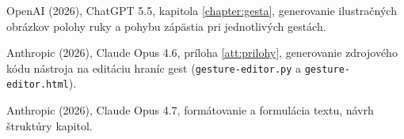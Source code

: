 \begin{trivlist}

\item OpenAI (2026), ChatGPT 5.5, kapitola \ref{chapter:gesta}, generovanie ilustračných obrázkov polohy ruky a pohybu zápästia pri jednotlivých gestách.

\item Anthropic (2026), Claude Opus 4.6, príloha \ref{att:prilohy}, generovanie zdrojového kódu nástroja na editáciu hraníc gest (\texttt{gesture-editor.py} a \texttt{gesture-editor.html}).

\item Anthropic (2026), Claude Opus 4.7, formátovanie a formulácia textu, návrh štruktúry kapitol.

\end{trivlist}

